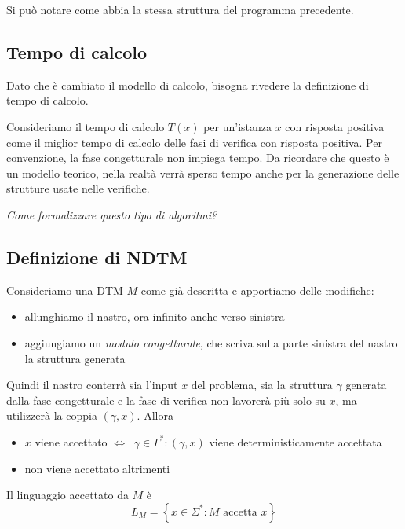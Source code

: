 Si può notare come abbia la stessa struttura del programma precedente.

\subsection{Tempo di calcolo}

Dato che è cambiato il modello di calcolo, bisogna rivedere la definizione di tempo di calcolo. 

Consideriamo il tempo di calcolo $T(x)$ per un'istanza $x$ con risposta positiva come il miglior tempo di calcolo delle fasi di verifica con risposta positiva. Per convenzione, la fase congetturale non impiega tempo. Da ricordare che questo è un modello teorico, nella realtà verrà sperso tempo anche per la generazione delle strutture usate nelle verifiche. 

\textit{Come formalizzare questo tipo di algoritmi?}

\subsection{Definizione di NDTM}

Consideriamo una DTM $M$ come già descritta e apportiamo delle modifiche: 
\begin{itemize}
	\item allunghiamo il nastro, ora infinito anche verso sinistra
	\item aggiungiamo un \textit{modulo congetturale}, che scriva sulla parte sinistra del nastro la struttura generata
\end{itemize}

Quindi il nastro conterrà sia l'input $x$ del problema, sia la struttura $\gamma$ generata dalla fase congetturale e la fase di verifica non lavorerà più solo su $x$, ma utilizzerà la coppia $(\gamma, x)$. Allora 
\begin{itemize}
	\item $x$ viene accettato $\Leftrightarrow \exists \gamma \in \Gamma^\ast: (\gamma, x)$ viene deterministicamente accettata
	\item non viene accettato altrimenti 
\end{itemize}

Il linguaggio accettato da $M$ è 
$$ L_M = \left\{x \in \Sigma^\ast: M \text{ accetta } x\right\} $$

